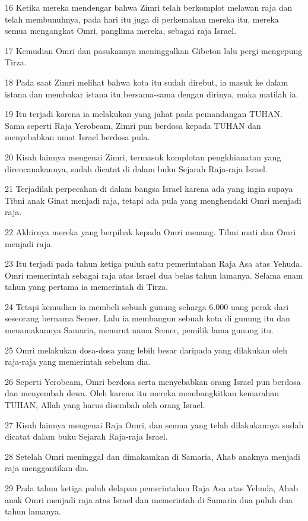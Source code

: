 \par 16 Ketika mereka mendengar bahwa Zimri telah berkomplot melawan raja dan telah membunuhnya, pada hari itu juga di perkemahan mereka itu, mereka semua mengangkat Omri, panglima mereka, sebagai raja Israel.
\par 17 Kemudian Omri dan pasukannya meninggalkan Gibeton lalu pergi mengepung Tirza.
\par 18 Pada saat Zimri melihat bahwa kota itu sudah direbut, ia masuk ke dalam istana dan membakar istana itu bersama-sama dengan dirinya, maka matilah ia.
\par 19 Itu terjadi karena ia melakukan yang jahat pada pemandangan TUHAN. Sama seperti Raja Yerobeam, Zimri pun berdosa kepada TUHAN dan menyebabkan umat Israel berdosa pula.
\par 20 Kisah lainnya mengenai Zimri, termasuk komplotan pengkhianatan yang direncanakannya, sudah dicatat di dalam buku Sejarah Raja-raja Israel.
\par 21 Terjadilah perpecahan di dalam bangsa Israel karena ada yang ingin supaya Tibni anak Ginat menjadi raja, tetapi ada pula yang menghendaki Omri menjadi raja.
\par 22 Akhirnya mereka yang berpihak kepada Omri menang. Tibni mati dan Omri menjadi raja.
\par 23 Itu terjadi pada tahun ketiga puluh satu pemerintahan Raja Asa atas Yehuda. Omri memerintah sebagai raja atas Israel dua belas tahun lamanya. Selama enam tahun yang pertama ia memerintah di Tirza.
\par 24 Tetapi kemudian ia membeli sebuah gunung seharga 6.000 uang perak dari seseorang bernama Semer. Lalu ia membangun sebuah kota di gunung itu dan menamakannya Samaria, menurut nama Semer, pemilik lama gunung itu.
\par 25 Omri melakukan dosa-dosa yang lebih besar daripada yang dilakukan oleh raja-raja yang memerintah sebelum dia.
\par 26 Seperti Yerobeam, Omri berdosa serta menyebabkan orang Israel pun berdosa dan menyembah dewa. Oleh karena itu mereka membangkitkan kemarahan TUHAN, Allah yang harus disembah oleh orang Israel.
\par 27 Kisah lainnya mengenai Raja Omri, dan semua yang telah dilakukannya sudah dicatat dalam buku Sejarah Raja-raja Israel.
\par 28 Setelah Omri meninggal dan dimakamkan di Samaria, Ahab anaknya menjadi raja menggantikan dia.
\par 29 Pada tahun ketiga puluh delapan pemerintahan Raja Asa atas Yehuda, Ahab anak Omri menjadi raja atas Israel dan memerintah di Samaria dua puluh dua tahun lamanya.
